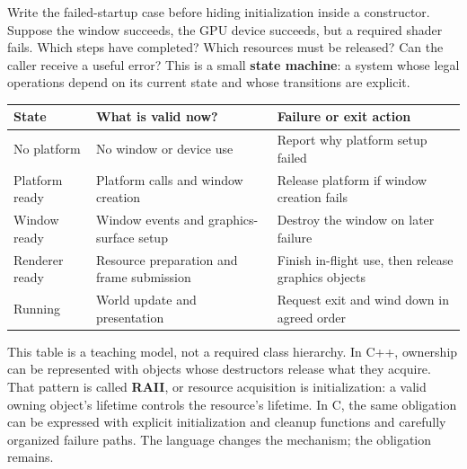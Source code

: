 Write the failed-startup case before hiding initialization inside a constructor. Suppose the window succeeds, the GPU device succeeds, but a required shader fails. Which steps have completed? Which resources must be released? Can the caller receive a useful error? This is a small \textbf{state machine}: a system whose legal operations depend on its current state and whose transitions are explicit.

{\def\LTcaptype{none} %
\begin{longtable}[]{@{}
  >{\raggedright\arraybackslash}p{}
  >{\raggedright\arraybackslash}p{}
  >{\raggedright\arraybackslash}p{}@{}}
\toprule\noalign{}
\begin{minipage}[b]{\linewidth}\raggedright
State
\end{minipage} & \begin{minipage}[b]{\linewidth}\raggedright
What is valid now?
\end{minipage} & \begin{minipage}[b]{\linewidth}\raggedright
Failure or exit action
\end{minipage} \\
\midrule\noalign{}
\endhead
\bottomrule\noalign{}
\endlastfoot
No platform & No window or device use & Report why platform setup failed \\
Platform ready & Platform calls and window creation & Release platform if window creation fails \\
Window ready & Window events and graphics-surface setup & Destroy the window on later failure \\
Renderer ready & Resource preparation and frame submission & Finish in-flight use, then release graphics objects \\
Running & World update and presentation & Request exit and wind down in agreed order \\
\end{longtable}
}

This table is a teaching model, not a required class hierarchy. In C++, ownership can be represented with objects whose destructors release what they acquire. That pattern is called \textbf{RAII}, or resource acquisition is initialization: a valid owning object's lifetime controls the resource's lifetime. In C, the same obligation can be expressed with explicit initialization and cleanup functions and carefully organized failure paths. The language changes the mechanism; the obligation remains.

